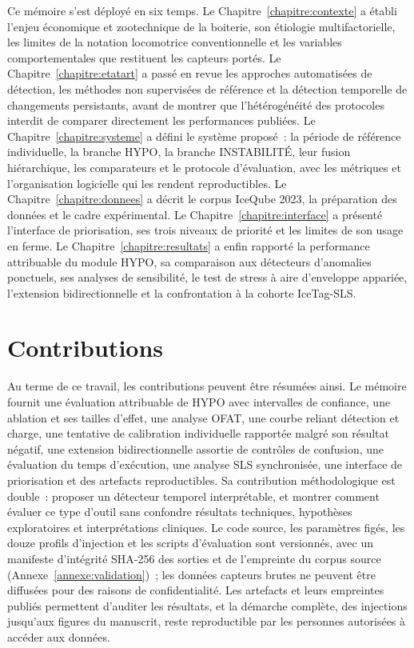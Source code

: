 Ce mémoire s'est déployé en six temps. Le Chapitre~\ref{chapitre:contexte} a établi l'enjeu
économique et zootechnique de la boiterie, son étiologie multifactorielle, les limites de la
notation locomotrice conventionnelle et les variables comportementales que restituent les
capteurs portés. Le Chapitre~\ref{chapitre:etatart} a passé en revue les approches automatisées
de détection, les méthodes non supervisées de référence et la détection temporelle de
changements persistants, avant de montrer que l'hétérogénéité des protocoles interdit de
comparer directement les performances publiées. Le Chapitre~\ref{chapitre:systeme} a défini le
système proposé~: la période de référence individuelle, la branche HYPO, la branche
INSTABILITÉ, leur fusion hiérarchique, les comparateurs et le protocole d'évaluation, avec les
métriques et l'organisation logicielle qui les rendent reproductibles. Le
Chapitre~\ref{chapitre:donnees} a décrit le corpus IceQube 2023, la préparation des données et
le cadre expérimental. Le Chapitre~\ref{chapitre:interface} a présenté l'interface de
priorisation, ses trois niveaux de priorité et les limites de son usage en ferme. Le
Chapitre~\ref{chapitre:resultats} a enfin rapporté la performance attribuable du module HYPO,
sa comparaison aux détecteurs d'anomalies ponctuels, ses analyses de sensibilité, le test de
stress à aire d'enveloppe appariée, l'extension bidirectionnelle et la confrontation à la
cohorte IceTag-SLS.

\section{Contributions}
Au terme de ce travail, les contributions peuvent être résumées ainsi. Le mémoire fournit une
évaluation attribuable de HYPO avec intervalles de confiance, une ablation et ses tailles
d'effet, une analyse OFAT, une courbe reliant détection et charge, une tentative de
calibration individuelle rapportée malgré son résultat négatif, une extension bidirectionnelle
assortie de contrôles de confusion, une évaluation du temps d'exécution, une analyse SLS
synchronisée, une interface de priorisation et des artefacts reproductibles. Sa contribution
méthodologique est double~: proposer un détecteur temporel interprétable, et montrer comment
évaluer ce type d'outil sans confondre résultats techniques, hypothèses exploratoires et
interprétations cliniques. Le code source, les paramètres figés, les douze profils d'injection
et les scripts d'évaluation sont versionnés, avec un manifeste d'intégrité SHA-256 des sorties
et de l'empreinte du corpus source (Annexe~\ref{annexe:validation})~; les données capteurs brutes ne peuvent être diffusées pour
des raisons de confidentialité. Les artefacts et leurs empreintes publiés permettent d'auditer
les résultats, et la démarche complète, des injections jusqu'aux figures du manuscrit, reste
reproductible par les personnes autorisées à accéder aux données.

